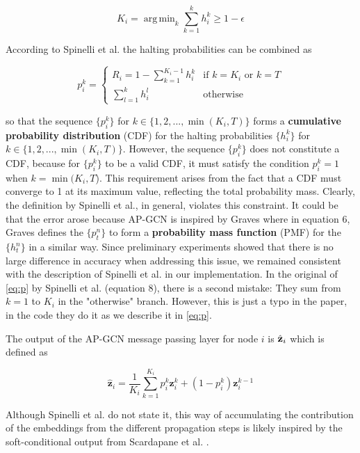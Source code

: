 \documentclass{gdl}
\DeclareMathOperator*{\argmin}{arg\,min}
\begin{document}
\begin{equation}
    K_i = \argmin_{k} \sum_{k=1}^{k} h_i^k \geq 1-\epsilon
\end{equation}

\noindent According to Spinelli et al. the halting probabilities can be combined as

\begin{equation}
    p_i^k = 
    \begin{cases}
    R_i = 1 - \sum_{k=1}^{K_i - 1} h_i^k & \text{if } k = K_i \text{ or } k = T \\
    \sum_{l=1}^{k} h_i^l & \text{otherwise}
    \end{cases}
    \label{eq:p}
\end{equation}

\noindent so that the sequence $\{p_i^k\}$ for $k \in \{1,2,...,\min(K_i, T)\}$ forms a \textbf{cumulative probability distribution} (CDF) for the halting probabilities $\{h_i^k\}$ for $k \in \{1,2,...,\min(K_i, T)\}$. However, the sequence $\{p_i^k\}$ does not constitute a CDF, because for $\{p_i^k\}$ to be a valid CDF, it must satisfy the condition $p_i^k = 1$ when $k = \min(K_i,T$). This requirement arises from the fact that a CDF must converge to 1 at its maximum value, reflecting the total probability mass. Clearly, the definition by Spinelli et al., in general, violates this constraint. It could be that the error arose because AP-GCN is inspired by Graves \cite{graves2017} where in equation 6, Graves defines the $\{p_t^n\}$ to form a \textbf{probability mass function} (PMF) for the $\{h_t^n\}$ in a similar way. Since preliminary experiments showed that there is no large difference in accuracy when addressing this issue, we remained consistent with the description of Spinelli et al. in our implementation. In the original of \autoref{eq:p} by Spinelli et al. (equation 8), there is a second mistake: They sum from $k=1$ to $K_i$ in the "otherwise" branch. However, this is just a typo in the paper, in the code they do it as we describe it in \autoref{eq:p}.

The output of the AP-GCN message passing layer for node $i$ is $\hat{\bf{z}}_i$ which is defined as

\begin{equation}
\hat{\mathbf{z}}_i = \frac{1}{K_i} \sum_{k=1}^{K_i} p_i^k \mathbf{z}^k_i + (1-p^k_i) \mathbf{z}_i^{k-1} 
\label{eq:aggregate}
\end{equation}

\noindent Although Spinelli et al. do not state it, this way of accumulating the contribution of the embeddings from the different propagation steps is likely inspired by the soft-conditional output from Scardapane et al. \cite{scardapane2020}.
\end{document}
